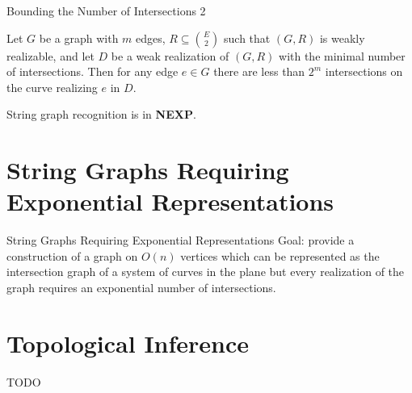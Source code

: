 \documentclass[10pt,aspectratio=169]{beamer}
\theoremstyle{plain} %
\theoremstyle{remark} %
\begin{document}
\begin{frame}{Bounding the Number of Intersections 2}
    \begin{theorem}
        Let \(G\) be a graph with \(m\) edges, \(R \subseteq \binom{E}{2}\) such that \((G, R)\) is weakly realizable, and let \(D\) 
        be a weak realization of \((G, R)\) with the minimal number of intersections. Then for any edge \(e \in G\) 
        there are less than \(2^m\) intersections on the curve realizing \(e\) in \(D\).
    \end{theorem}
    \begin{corollary}
        String graph recognition is in \textbf{NEXP}.
    \end{corollary}
\end{frame}

\section{String Graphs Requiring Exponential Representations}

\begin{frame}{String Graphs Requiring Exponential Representations}
    Goal: provide a construction of a graph on \(O(n)\) vertices which can be represented as the intersection graph 
    of a system of curves in the plane but every realization of the graph requires an exponential number of intersections.
\end{frame}

\section{Topological Inference}

\begin{frame}{TODO}
    
\end{frame}
\end{document}
